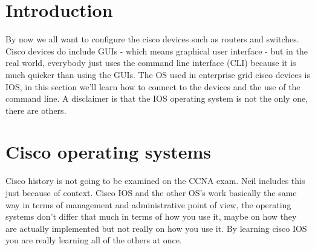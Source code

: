 \section{Introduction}
By now we all want to configure the cisco devices such as routers and switches. Cisco devices do include GUIs - which means graphical user interface - but in the real world, everybody just uses the command line interface (CLI) because it is much quicker than using the GUIs. The OS used in enterprise grid cisco devices is IOS, in this section we'll learn how to connect to the devices and the use of the command line. A disclaimer is that the IOS operating system is not the only one, there are others.


\section{Cisco operating systems}
Cisco history is not going to be examined on the CCNA exam. Neil includes this just because of context. Cisco IOS and the other OS's work basically the same way in terms of management and administrative point of view, the operating systems don't differ that much in terms of how you use it, maybe on how they are actually implemented but not really on how you use it. By learning cisco IOS you are really learning all of the others at once.


